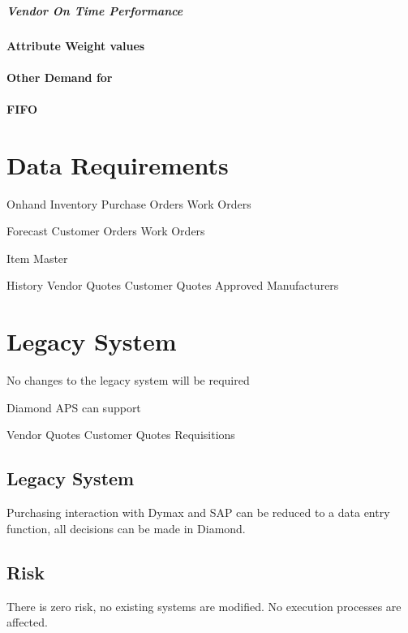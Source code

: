 \documentclass[letterpaper,10pt,english]{sphinxmanual}
\begin{document}
\paragraph{Vendor On Time Performance}
\label{BusinessProcessReengineering:vendor-on-time-performance}

\subsubsection{Attribute Weight values}
\label{BusinessProcessReengineering:attribute-weight-values}

\subsubsection{Other Demand for}
\label{BusinessProcessReengineering:other-demand-for}

\subsubsection{FIFO}
\label{BusinessProcessReengineering:fifo}

\chapter{Data Requirements}
\label{BusinessProcessReengineering:data-requirements}
Onhand Inventory Purchase Orders Work Orders

Forecast Customer Orders Work Orders

Item Master

History Vendor Quotes Customer Quotes Approved Manufacturers


\chapter{Legacy System}
\label{BusinessProcessReengineering:legacy-system}
No changes to the legacy system will be required

Diamond APS can support

Vendor Quotes Customer Quotes Requisitions


\section{Legacy System}
\label{BusinessProcessReengineering:id2}
Purchasing interaction with Dymax and SAP can be reduced to a data entry
function, all decisions can be made in Diamond.


\section{Risk}
\label{BusinessProcessReengineering:risk}
There is zero risk, no existing systems are modified. No execution
processes are affected.
\end{document}
